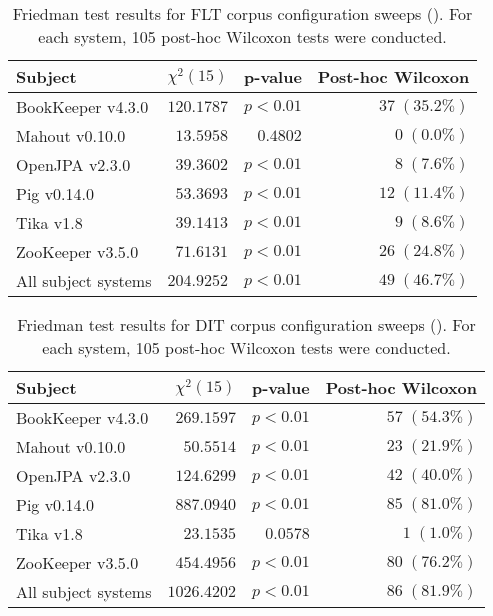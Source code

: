 \begin{table}
\begin{spacing}{1.2}
\centering
\caption[Friedman test results for FLT corpus configuration sweeps (\ctwo)]{Friedman test results for FLT corpus configuration sweeps (\ctwo).  For each system, 105 post-hoc Wilcoxon tests were conducted.}
\label{table:combo-friedman-flt}
\begin{tabular}{lrrr}
\toprule
                      Subject & $\chi^2(15)$ &  p-value & Post-hoc Wilcoxon \\
\midrule
            BookKeeper v4.3.0 &   $120.1787$ & $p<0.01$ &    $37\;(35.2\%)$ \\
               Mahout v0.10.0 &    $13.5958$ & $0.4802$ &      $0\;(0.0\%)$ \\
               OpenJPA v2.3.0 &    $39.3602$ & $p<0.01$ &      $8\;(7.6\%)$ \\
                  Pig v0.14.0 &    $53.3693$ & $p<0.01$ &    $12\;(11.4\%)$ \\
                    Tika v1.8 &    $39.1413$ & $p<0.01$ &      $9\;(8.6\%)$ \\
             ZooKeeper v3.5.0 &    $71.6131$ & $p<0.01$ &    $26\;(24.8\%)$ \\
 \midrule
All subject systems &   $204.9252$ & $p<0.01$ &    $49\;(46.7\%)$ \\
\bottomrule
\end{tabular}

\end{spacing}
\end{table}

\begin{table}
\begin{spacing}{1.2}
\centering
\caption[Friedman test results for DIT corpus configuration sweeps (\ctwo)]{Friedman test results for DIT corpus configuration sweeps (\ctwo).  For each system, 105 post-hoc Wilcoxon tests were conducted.}
\label{table:combo-friedman-dit}
\begin{tabular}{lrrr}
\toprule
                      Subject & $\chi^2(15)$ &  p-value & Post-hoc Wilcoxon \\
\midrule
            BookKeeper v4.3.0 &   $269.1597$ & $p<0.01$ &    $57\;(54.3\%)$ \\
               Mahout v0.10.0 &    $50.5514$ & $p<0.01$ &    $23\;(21.9\%)$ \\
               OpenJPA v2.3.0 &   $124.6299$ & $p<0.01$ &    $42\;(40.0\%)$ \\
                  Pig v0.14.0 &   $887.0940$ & $p<0.01$ &    $85\;(81.0\%)$ \\
                    Tika v1.8 &    $23.1535$ & $0.0578$ &      $1\;(1.0\%)$ \\
             ZooKeeper v3.5.0 &   $454.4956$ & $p<0.01$ &    $80\;(76.2\%)$ \\
 \midrule
All subject systems &  $1026.4202$ & $p<0.01$ &    $86\;(81.9\%)$ \\
\bottomrule
\end{tabular}

\end{spacing}
\end{table}

